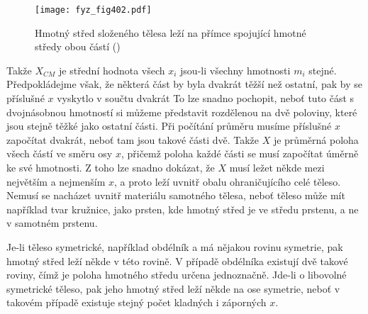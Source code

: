     \begin{figure}[ht!] %
      \centering
      \texttt{[image: fyz\_fig402.pdf]}
      \caption{Hmotný střed složeného tělesa leží na přímce spojující hmotné středy obou částí
              (\cite[s.~260]{Feynman01})}
      \label{fyz:fig402}
    \end{figure}

    Takže \(X_{CM}\) je střední hodnota všech \(x_i\) jsou-li všechny hmotnosti \(m_i\) stejné.
    Předpokládejme však, že některá část by byla dvakrát těžší než ostatní, pak by se příslušné
    \(x\) vyskytlo v součtu dvakrát To lze snadno pochopit, neboť tuto část s dvojnásobnou hmotností
    si můžeme představit rozdělenou na dvě poloviny, které jsou stejně těžké jako ostatní části. Při
    počítání průměru musíme příslušné \(x\) započítat dvakrát, neboť tam jsou takové části dvě.
    Takže \(X\) je průměrná poloha všech částí ve směru osy \(x\), přičemž poloha každé části se
    musí započítat úměrně ke své hmotnosti. Z toho lze snadno dokázat, že \(X\) musí ležet někde
    mezi největším a nejmenším \(x\), a proto leží uvnitř obalu ohraničujícího celé těleso. Nemusí
    se nacházet uvnitř materiálu samotného tělesa, neboť těleso může mít například tvar kružnice,
    jako prsten, kde hmotný střed je ve středu prstenu, a ne v samotném prstenu.

    Je-li těleso symetrické, například obdélník a má nějakou rovinu symetrie, pak hmotný střed leží
    někde v této rovině. V případě obdélníka existují dvě takové roviny, čímž je poloha hmotného
    středu určena jednoznačně. Jde-li o libovolné symetrické těleso, pak jeho hmotný střed leží
    někde na ose symetrie, neboť v takovém případě existuje stejný počet kladných i záporných \(x\).

